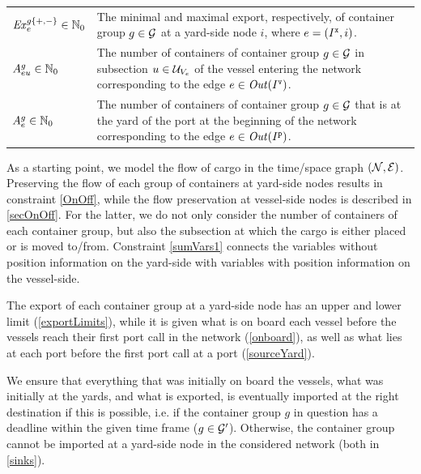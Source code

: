 \begin{table}[width=.9\linewidth,cols=2,pos=htbp]
\begin{tabular*}{\tblwidth}{@{} Lp{10.8cm} @{}}
$\mathit{Ex}^{g\{+,-\}}_e\in\mathbb{N}_0$	
									& The minimal and maximal export, respectively, of container group $g\in \mathcal{G}$ at a yard-side node $i$, where $e=(I^\texttt{x},i)$.\\
$A^{g}_{eu}\in \mathbb{N}_0$			& The number of containers of container group $g\in\mathcal{G}$ in subsection $u\in \mathcal{U}_{V_e}$ of the vessel entering the network corresponding to the edge $e\in\mathit{Out}(I^\texttt{v})$.\\
$A^g_e\in \mathbb{N}_0$					& The number of containers of container group $g\in \mathcal{G}$ that is at the yard of the port at the beginning of the network corresponding to the edge $e\in\mathit{Out}(I^\texttt{p})$.\\
\bottomrule
\end{tabular*}
\end{table}

As a starting point, we model the flow of cargo in the time/space graph $(\mathcal{N},\mathcal{E})$. Preserving the flow of each group of containers at yard-side nodes results in constraint \eqref{OnOff}, while the flow preservation at vessel-side nodes is described in \eqref{secOnOff}. 
For the latter, we do not only consider the number of containers of each container group, but also the subsection at which the cargo is either placed or is moved to/from. Constraint \eqref{sumVars1} connects the variables without position information on the yard-side with variables with position information on the vessel-side. 

The export of each container group at a yard-side node has an upper and lower limit (\ref{exportLimits}), while it is given what is on board each vessel before the vessels reach their first port call in the network (\ref{onboard}), as well as what lies at each port before the first port call at a port (\ref{sourceYard}).

We ensure that everything that was initially on board the vessels, what was initially at the yards, and what is exported, is eventually imported at the right destination if this is possible, i.e. if the container group $g$ in question has a deadline within the given time frame ($g\in\mathcal{G}'$). Otherwise, the container group cannot be imported at a yard-side node in the considered network (both in \eqref{sinks}).  


